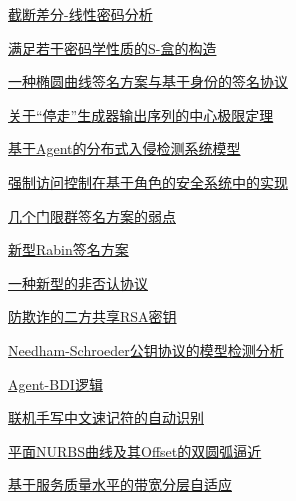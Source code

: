 \documentclass[a4paper]{article}
\begin{document}
\href{http://www.jos.org.cn/ch/reader/download_pdf.aspx?file_no=20001003&year_id=2000&quarter_id=10&falg=1}{截断差分-线性密码分析}

\href{http://www.jos.org.cn/ch/reader/download_pdf.aspx?file_no=20001004&year_id=2000&quarter_id=10&falg=1}{满足若干密码学性质的S-盒的构造}

\href{http://www.jos.org.cn/ch/reader/download_pdf.aspx?file_no=20001005&year_id=2000&quarter_id=10&falg=1}{一种椭圆曲线签名方案与基于身份的签名协议}

\href{http://www.jos.org.cn/ch/reader/download_pdf.aspx?file_no=20001006&year_id=2000&quarter_id=10&falg=1}{关于“停走”生成器输出序列的中心极限定理}

\href{http://www.jos.org.cn/ch/reader/download_pdf.aspx?file_no=20001007&year_id=2000&quarter_id=10&falg=1}{基于Agent的分布式入侵检测系统模型}

\href{http://www.jos.org.cn/ch/reader/download_pdf.aspx?file_no=20001008&year_id=2000&quarter_id=10&falg=1}{强制访问控制在基于角色的安全系统中的实现}

\href{http://www.jos.org.cn/ch/reader/download_pdf.aspx?file_no=20001009&year_id=2000&quarter_id=10&falg=1}{几个门限群签名方案的弱点}

\href{http://www.jos.org.cn/ch/reader/download_pdf.aspx?file_no=20001010&year_id=2000&quarter_id=10&falg=1}{新型Rabin签名方案}

\href{http://www.jos.org.cn/ch/reader/download_pdf.aspx?file_no=20001011&year_id=2000&quarter_id=10&falg=1}{一种新型的非否认协议}

\href{http://www.jos.org.cn/ch/reader/download_pdf.aspx?file_no=20001012&year_id=2000&quarter_id=10&falg=1}{防欺诈的二方共享RSA密钥}

\href{http://www.jos.org.cn/ch/reader/download_pdf.aspx?file_no=20001013&year_id=2000&quarter_id=10&falg=1}{Needham-Schroeder公钥协议的模型检测分析}

\href{http://www.jos.org.cn/ch/reader/download_pdf.aspx?file_no=20001014&year_id=2000&quarter_id=10&falg=1}{Agent-BDI逻辑}

\href{http://www.jos.org.cn/ch/reader/download_pdf.aspx?file_no=20001015&year_id=2000&quarter_id=10&falg=1}{联机手写中文速记符的自动识别}

\href{http://www.jos.org.cn/ch/reader/download_pdf.aspx?file_no=20001016&year_id=2000&quarter_id=10&falg=1}{平面NURBS曲线及其Offset的双圆弧逼近}

\href{http://www.jos.org.cn/ch/reader/download_pdf.aspx?file_no=20001017&year_id=2000&quarter_id=10&falg=1}{基于服务质量水平的带宽分层自适应}
\end{document}
